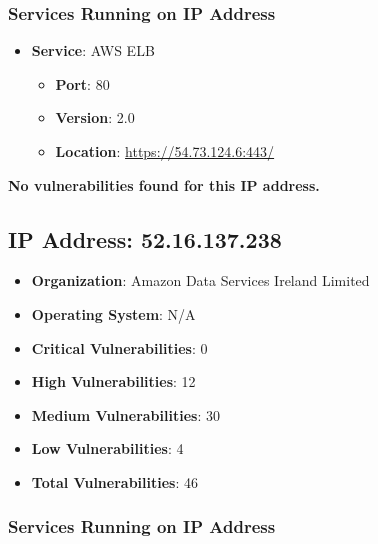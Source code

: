 \documentclass{article}
\begin{document}
\subsubsection*{Services Running on IP Address}

\begin{itemize}
    
        \item \textbf{Service}: AWS ELB
        \begin{itemize}
            \item \textbf{Port}: 80
            \item \textbf{Version}:  2.0 
            \item \textbf{Location}: \href{ https://54.73.124.6:443/ }{ https://54.73.124.6:443/ }
        \end{itemize}
    
\end{itemize}


\textbf{No vulnerabilities found for this IP address.}




\clearpage



\subsection{IP Address: 52.16.137.238}

\begin{itemize}
    \item \textbf{Organization}: Amazon Data Services Ireland Limited
    \item \textbf{Operating System}:  N/A 
    \item \textbf{Critical Vulnerabilities}: 0
    \item \textbf{High Vulnerabilities}: 12
    \item \textbf{Medium Vulnerabilities}: 30
    \item \textbf{Low Vulnerabilities}: 4
    \item \textbf{Total Vulnerabilities}: 46
\end{itemize}

\subsubsection*{Services Running on IP Address}
\end{document}
